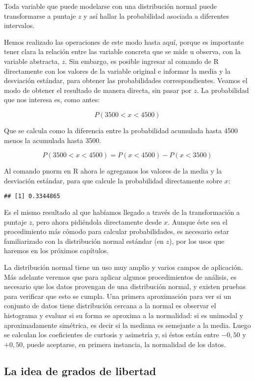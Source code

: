 \documentclass[]{article}
\begin{document}
Toda variable que puede modelarse con una distribución normal puede
transformarse a puntaje \(z\) y así hallar la probabilidad asociada a
diferentes intervalos.

Hemos realizado las operaciones de este modo hasta aquí, porque es
importante tener clara la relación entre las variable concreta que se
mide u observa, con la variable abstracta, \(z\). Sin embargo, es
posible ingresar al comando de R directamente con los valores de la
variable original e informar la media y la desviación estándar, para
obtener las probabilidades correspondientes. Veamos el modo de obtener
el resultado de manera directa, sin pasar por \(z\). La probabilidad que
nos interesa es, como antes:

\[P(3500 < x < 4500)\]

Que se calcula como la diferencia entre la probabilidad acumulada hasta
4500 menos la acumulada hasta 3500.

\[P(3500 < x < 4500) = P(x < 4500) - P(x < 3500)\]

Al comando pnorm en R ahora le agregamos los valores de la media y la
desviación estándar, para que calcule la probabilidad directamente sobre
\(x\):

\begin{verbatim}
## [1] 0.3344865
\end{verbatim}

Es el mismo resultado al que habíamos llegado a través de la
transformación a puntaje \(z\), pero ahora pidiéndola directamente desde
\(x\). Aunque éste sea el procedimiento más cómodo para calcular
probabilidades, es necesario estar familiarizado con la distribución
normal estándar (en \(z\)), por los usos que haremos en los próximos
capítulos.

La distribución normal tiene un uso muy amplio y varios campos de
aplicación. Más adelante veremos que para aplicar algunos procedimientos
de análisis, es necesario que los datos provengan de una distribución
normal, y existen pruebas para verificar que esto se cumpla. Una primera
aproximación para ver si un conjunto de datos tiene distribución cercana
a la normal es observar el histograma y evaluar si su forma se aproxima
a la normalidad: si es unimodal y aproximadamente simétrica, es decir si
la mediana es semejante a la media. Luego se calculan los coeficientes
de curtosis y asimetría y, si éstos están entre \(-0,50\) y \(+0,50\),
puede aceptarse, en primera instancia, la normalidad de los datos.

\hypertarget{la-idea-de-grados-de-libertad}{%
\subsection{La idea de grados de
libertad}\label{la-idea-de-grados-de-libertad}}
\end{document}
